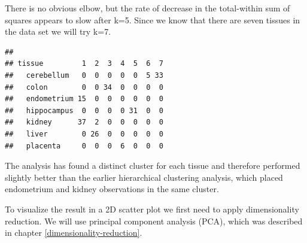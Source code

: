 \documentclass[]{book}
\newenvironment{Shaded}{\begin{snugshade}}{\end{snugshade}}
\newcommand{\KeywordTok}[1]{\textcolor[rgb]{0.13,0.29,0.53}{\textbf{{#1}}}}
\newcommand{\DataTypeTok}[1]{\textcolor[rgb]{0.13,0.29,0.53}{{#1}}}
\newcommand{\DecValTok}[1]{\textcolor[rgb]{0.00,0.00,0.81}{{#1}}}
\newcommand{\StringTok}[1]{\textcolor[rgb]{0.31,0.60,0.02}{{#1}}}
\newcommand{\NormalTok}[1]{{#1}}
\theoremstyle{definition}
\theoremstyle{definition}
\theoremstyle{definition}
\theoremstyle{remark}
\begin{document}
There is no obvious elbow, but the rate of decrease in the total-within
sum of squares appears to slow after k=5. Since we know that there are
seven tissues in the data set we will try k=7.

\begin{Shaded}
\end{Shaded}

\begin{verbatim}
##              
## tissue         1  2  3  4  5  6  7
##   cerebellum   0  0  0  0  0  5 33
##   colon        0  0 34  0  0  0  0
##   endometrium 15  0  0  0  0  0  0
##   hippocampus  0  0  0  0 31  0  0
##   kidney      37  2  0  0  0  0  0
##   liver        0 26  0  0  0  0  0
##   placenta     0  0  0  6  0  0  0
\end{verbatim}

The analysis has found a distinct cluster for each tissue and therefore
performed slightly better than the earlier hierarchical clustering
analysis, which placed endometrium and kidney observations in the same
cluster.

To visualize the result in a 2D scatter plot we first need to apply
dimensionality reduction. We will use principal component analysis
(PCA), which was described in chapter \ref{dimensionality-reduction}.

\begin{Shaded}
\end{Shaded}
\end{document}
